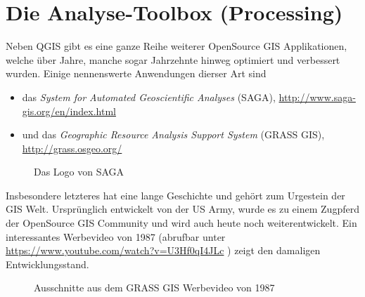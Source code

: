 \documentclass[a4paper,12pt,ngerman]{sphinxmanual}
\begin{document}
\section{Die Analyse-Toolbox (Processing)}
\label{uebung3:die-analyse-toolbox-processing}
Neben QGIS gibt es eine ganze Reihe weiterer OpenSource GIS Applikationen, welche über Jahre, manche sogar Jahrzehnte hinweg optimiert und verbessert wurden.
Einige nennenswerte Anwendungen dierser Art sind
\begin{itemize}
\item {} 
das \emph{System for Automated Geoscientific Analyses} (SAGA), \href{http://www.saga-gis.org/en/index.html}{http://www.saga-gis.org/en/index.html}

\item {} 
und das \emph{Geographic Resource Analysis Support System} (GRASS GIS), \href{http://grass.osgeo.org/}{http://grass.osgeo.org/}

\end{itemize}
\begin{figure}[htbp]
\centering
\capstart

\caption{Das Logo von SAGA}\label{uebung3:figsaga}\end{figure}

Insbesondere letzteres hat eine lange Geschichte und gehört zum Urgestein der GIS Welt. Ursprünglich entwickelt von der US Army, wurde es zu einem Zugpferd der OpenSource GIS Community und wird auch heute noch weiterentwickelt. Ein interessantes Werbevideo von 1987 (abrufbar unter \href{https://www.youtube.com/watch?v=U3Hf0qI4JLc}{https://www.youtube.com/watch?v=U3Hf0qI4JLc} ) zeigt den damaligen Entwicklungsstand.
\begin{figure}[htbp]
\centering
\capstart

\caption{Ausschnitte aus dem GRASS GIS Werbevideo von 1987}\label{uebung3:figgrass}\end{figure}
\end{document}
